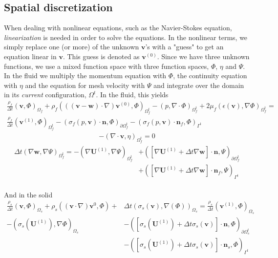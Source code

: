 \subsection{Spatial discretization}
When dealing with nonlinear equations, such as the Navier-Stokes equation, \textit{linearization} is needed in order to solve the equations. In the nonlinear terms, we simply replace one (or more) of the unknown $\mathbf{v}$'s with a "guess" to get an equation linear in $\mathbf{v}$. This guess is denoted as $\mathbf{v}^{(0)}$. Since we have three unknown functions, we use a mixed function space with three function spaces, $\Phi$, $\eta$ and $\Psi$. In the fluid we multiply the momentum equation with $\Phi$, the continuity equation with $\eta$ and the equation for mesh velocity with $\Psi$ and integrate over the domain in its \textit{current} configuration, $\Omega^t$. In the fluid, this yields
\begin{align}
\frac{\rho_f}{\Delta t}(\mathbf{v},\Phi)_{\Omega_f} + \rho_f(((\mathbf{v}-\mathbf{w})\cdot \nabla) \mathbf{v}^{(0)}, \Phi)_{\Omega_f^t} - (p,\nabla \cdot \Phi)_{\Omega_f^t} + 2\mu_f(\epsilon(\mathbf{v}), \nabla \Phi)_{\Omega_f^t} = \\ 
\frac{\rho_f}{\Delta t}(\mathbf{v}^{(1)},\Phi)_{\Omega_f^t} - (\sigma_f(p,\mathbf{v})\cdot \mathbf{n}, \Phi)_{\partial \Omega_f^t} - (\sigma_f(p,\mathbf{v}) \cdot \mathbf{n}_f, \Phi)_{\Gamma^t} \label{VarMom}
\end{align}
\begin{align}
-(\nabla \cdot \mathbf{v},\eta)_{\Omega_f^t} = 0 \label{VarCon}
\end{align}
\begin{align}
\Delta t(\nabla \mathbf{w}, \nabla \Psi)_{\Omega_f^t} = - (\nabla \mathbf{U}^{(1)}, \nabla \Psi)_{\Omega_f^t} & + ([\nabla \mathbf{U}^{(1)} + \Delta t \nabla \mathbf{w}] \cdot \mathbf{n}, \Psi)_{\partial \Omega_f^t} \\ 
& + ([\nabla \mathbf{U}^{(1)} + \Delta t \nabla \mathbf{w}] \cdot \mathbf{n}_f, \Psi)_{\Gamma^t} \label{VarMesh}
\end{align}
\\
And in the solid
\begin{align}
\frac{\rho_s}{\Delta t}(\mathbf{v},\Phi)_{\Omega_s} + \rho_s((\mathbf{v}\cdot \nabla)\mathbf{v}^0,\Phi) + & \Delta t (\sigma_s (\mathbf{v}), \nabla(\Phi))_{\Omega_s}  = \frac{\rho_s}{\Delta t}(\mathbf{v}^{(1)},\Phi)_{\Omega_s} \\ - (\sigma_s(\mathbf{U}^{(1)}), \nabla \Phi)_{\Omega_s} & - ([\sigma_s(\mathbf{U}^{(1)}) + \Delta t \sigma_s(\mathbf{v})]\cdot \mathbf{n}, \Phi)_{\partial \Omega_s^t} \\
& - ([\sigma_s(\mathbf{U}^{(1)}) + \Delta t \sigma_s(\mathbf{v})]\cdot \mathbf{n}_s, \Phi)_{\Gamma^t} \label{VarMom2}
\end{align}
